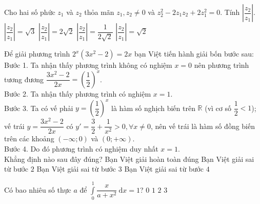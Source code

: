 \begin{ex}%
Cho hai số phức $z_1$ và $z_2$ thỏa mãn $z_1,z_2 \neq 0$ và $z_2^2-2z_1z_2 +2z_1^2=0$. Tính $\left |\dfrac{z_2}{z_1}\right |$. 
\choice
{$\left |\dfrac{z_2}{z_1}\right | = \sqrt{3}$}
{$\left |\dfrac{z_2}{z_1}\right |=2\sqrt{2}$}
{$\left |\dfrac{z_2}{z_1}\right |=\dfrac{1}{2\sqrt{2}}$}
{\True $\left |\dfrac{z_2}{z_1}\right |=\sqrt{2}$}
\end{ex}

\begin{ex}%
Để giải phương trình $2^x(3x^2-2)=2x$ bạn Việt tiến hành giải bốn bước sau: \\
Bước 1. Ta nhận thấy phương trình không có nghiệm $x=0$ nên phương trình tương đương $\dfrac{3x^2-2}{2x}=\left (\dfrac{1}{2}\right )^x$.  \\
Bước 2. Ta nhận thấy phương trình  có nghiệm $x=1$.  \\
Bước 3. Ta có vế phải $y=\left (\dfrac{1}{2}\right )^x$ là hàm số nghịch biến trên $\mathbb{R}$ (vì cơ số $\dfrac{1}{2} <1$); vế trái $y=\dfrac{3x^2-2}{2x}$ có $y' = \dfrac{3}{2} + \dfrac{1}{x^2} >0, \forall x \neq 0$, nên vế trái là hàm số đồng biến trên các khoảng $(-\infty;0)$ và $(0;+\infty)$. \\
Bước 4. Do đó phương trình có nghiệm duy nhất $x=1$. \\
Khẳng định nào sau đây đúng?
\choice
{Bạn Việt giải hoàn toàn đúng}
{Bạn Việt giải sai từ bước $2$}
{Bạn Việt giải sai từ bước $3$}
{\True Bạn Việt giải sai từ bước $4$}
\end{ex}

\begin{ex}%
Có bao nhiêu số thực $a$ để $\displaystyle \int\limits_{0}^{1} \dfrac{x}{a+x^2} ~\mathrm{d}x=1$?
\choice
{$0$}
{\True $1$}
{$2$}
{$3$}
\end{ex}


